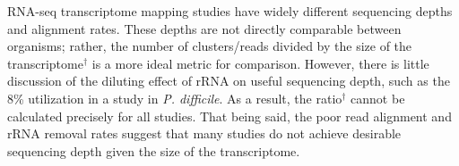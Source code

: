 \begin{table}
\begin{center}

\end{center}
\caption{Study Comparison: Poor Data Utilization Rates}\label{table:study_compare}
\small
RNA-seq transcriptome mapping studies have widely different sequencing depths and alignment rates. These depths are not directly comparable between organisms; rather, the number of clusters/reads divided by the size of the transcriptome$^{\dagger}$ is a more ideal metric for comparison. However, there is little discussion of the diluting effect of rRNA on useful sequencing depth, such as the 8\% utilization in a study in \textit{P. difficile}.\cite{115} As a result, the ratio$^{\dagger}$ cannot be calculated precisely for all studies. That being said, the poor read alignment and rRNA removal rates suggest that many studies do not achieve desirable sequencing depth given the size of the transcriptome.
\end{table}


